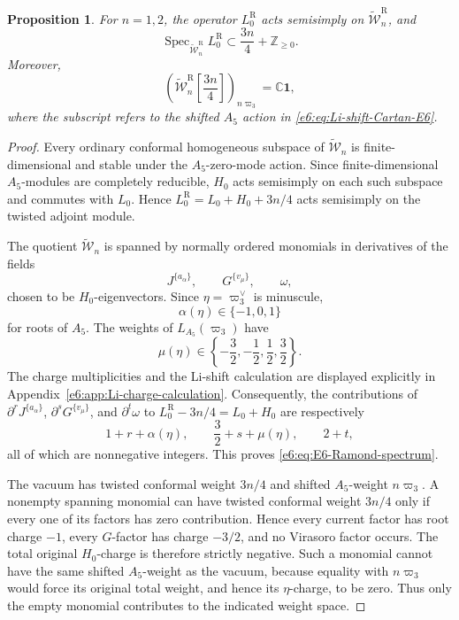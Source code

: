 \documentclass[11pt,reqno]{amsart}
\newtheorem{proposition}[theorem]{Proposition}
\theoremstyle{definition}
\theoremstyle{remark}
\begin{document}
\begin{proposition}\label{e6:prop:E6-Ramond-spectrum-vacuum-line}
For $n=1,2$, the operator $L_0^{\mathrm R}$ acts semisimply on
$\widetilde{\mathcal W}_n^{\mathrm R}$, and
\begin{equation}\label{e6:eq:E6-Ramond-spectrum}
  \operatorname{Spec}_{\widetilde{\mathcal W}_n^{\mathrm R}}L_0^{\mathrm R}
  \subset
  \frac{3n}{4}+\mathbb Z_{\ge0}.
\end{equation}
Moreover,
\begin{equation}\label{e6:eq:E6-extremal-vacuum-line}
  \left(
    \widetilde{\mathcal W}_n^{\mathrm R}
    \left[\frac{3n}{4}\right]
  \right)_{n\varpi_3}
  =\mathbb C\mathbf1,
\end{equation}
where the subscript refers to the shifted $A_5$ action in
\eqref{e6:eq:Li-shift-Cartan-E6}.
\end{proposition}

\begin{proof}
Every ordinary conformal homogeneous subspace of
$\widetilde{\mathcal W}_n$ is finite-dimensional and stable under the
$A_5$-zero-mode action.  Since finite-dimensional $A_5$-modules are
completely reducible, $H_0$ acts semisimply on each such subspace and
commutes with $L_0$.  Hence
$L_0^{\mathrm R}=L_0+H_0+3n/4$ acts semisimply on the twisted adjoint
module.

The quotient $\widetilde{\mathcal W}_n$ is spanned by normally ordered monomials
in derivatives of the fields
\[
  J^{\{a_\alpha\}},\qquad
  G^{\{v_\mu\}},\qquad
  \omega,
\]
chosen to be $H_0$-eigenvectors.  Since $\eta=\varpi_3^\vee$ is minuscule,
\[
  \alpha(\eta)\in\{-1,0,1\}
\]
for roots of $A_5$.  The weights of $L_{A_5}(\varpi_3)$ have
\[
  \mu(\eta)\in
  \left\{-\frac32,-\frac12,\frac12,\frac32\right\}.
\]
The charge multiplicities and the Li-shift calculation are displayed explicitly
in Appendix~\ref{e6:app:Li-charge-calculation}.  Consequently, the contributions of
$\partial^rJ^{\{a_\alpha\}}$,
$\partial^sG^{\{v_\mu\}}$, and $\partial^t\omega$ to
$L_0^{\mathrm R}-3n/4=L_0+H_0$ are respectively
\[
  1+r+\alpha(\eta),
  \qquad
  \frac32+s+\mu(\eta),
  \qquad
  2+t,
\]
all of which are nonnegative integers.  This proves
\eqref{e6:eq:E6-Ramond-spectrum}.

The vacuum has twisted conformal weight $3n/4$ and shifted $A_5$-weight
$n\varpi_3$.  A nonempty spanning monomial can have twisted conformal weight
$3n/4$ only if every one of its factors has zero contribution.  Hence every
current factor has root charge $-1$, every $G$-factor has charge $-3/2$, and no
Virasoro factor occurs.  The total original $H_0$-charge is therefore strictly
negative.  Such a monomial cannot have the same shifted $A_5$-weight as the
vacuum, because equality with $n\varpi_3$ would force its original total weight,
and hence its $\eta$-charge, to be zero.  Thus only the empty monomial contributes
to the indicated weight space.
\end{proof}
\end{document}
